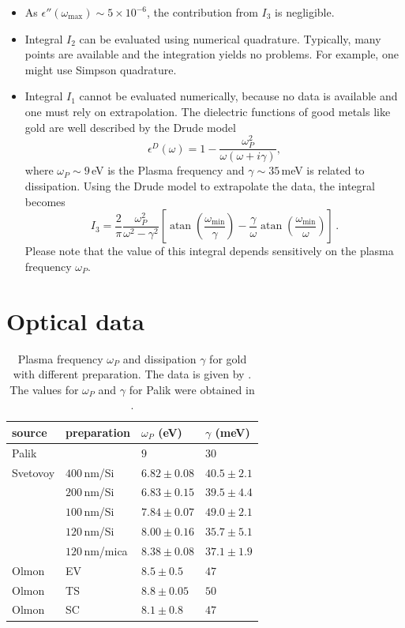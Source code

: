 \documentclass[twocolumn,superscriptaddress,pre]{revtex4-1}
\DeclareMathOperator{\atan}{atan}
\begin{document}
\begin{itemize}
\item As $\epsilon''(\omega_\mathrm{max}) \sim 5\times10^{-6}$, the contribution
from $I_3$ is negligible.
\item Integral $I_2$ can be evaluated using numerical quadrature. Typically,
many points are available and the integration yields no problems. For example,
one might use Simpson quadrature.
\item Integral $I_1$ cannot be evaluated numerically, because no data is
available and one must rely on extrapolation. The dielectric functions of good
metals like gold are well described by the Drude model
\begin{equation}
\label{eq:drude}
\epsilon^D(\omega) = 1 - \frac{\omega_P^2}{\omega(\omega+i\gamma)},
\end{equation}
where $\omega_P \sim 9\,$eV is the Plasma frequency and $\gamma \sim 35\,$meV
is related to dissipation. Using the Drude model to extrapolate the data, the
integral becomes
\begin{equation}
I_3 = \frac{2}{\pi} \frac{\omega_P^2}{\omega^2-\gamma^2} \left[ \atan\left(\frac{\omega_\mathrm{min}}{\gamma}\right) - \frac{\gamma}{\omega} \atan\left(\frac{\omega_\mathrm{min}}{\omega}\right)\right] \,.
\end{equation}
Please note that the value of this integral depends sensitively on the plasma
frequency $\omega_P$.
\end{itemize}

\section{Optical data}

\begin{table}
\begin{center}
\begin{tabular}{|ll|l|l|}
\hline
source & preparation & $\omega_P$ (eV) & $\gamma$ (meV) \\
\hline
\hline
Palik & & $9$ & $30$ \\
\hline
Svetovoy & $400\,$nm/Si & $6.82\pm0.08$ & $40.5\pm2.1$ \\
         & $200\,$nm/Si & $6.83\pm0.15$ & $39.5\pm4.4$ \\
         & $100\,$nm/Si & $7.84\pm0.07$ & $49.0\pm2.1$ \\
         & $120\,$nm/Si & $8.00\pm0.16$ & $35.7\pm5.1$ \\
         & $120\,$nm/mica & $8.38\pm0.08$ & $37.1\pm1.9$ \\
\hline
Olmon & EV & $8.5\pm0.5$ & $47$ \\
Olmon & TS & $8.8\pm0.05$ & $50$ \\
Olmon & SC & $8.1\pm0.8$ & $47$ \\
\hline
\end{tabular}
\end{center}
\caption{Plasma frequency $\omega_P$ and dissipation $\gamma$ for gold with
different preparation. The data is given by \cite{Palik1995,Olmon2012,Svetovoy2008}.
The values for $\omega_P$ and $\gamma$ for Palik were obtained in \cite{Lambrecht2000}.}
\label{tab:gold}
\end{table}
\end{document}
